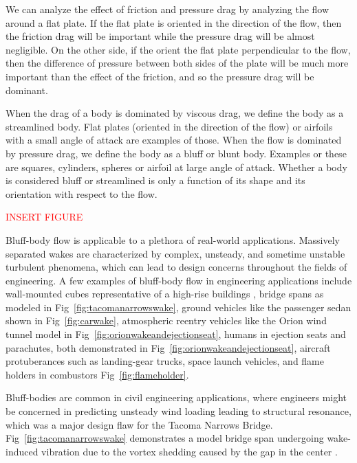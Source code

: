 \documentclass[journal]{new-aiaa}
\begin{document}
We can analyze the effect of friction and pressure drag by analyzing the flow around a flat plate. If the flat plate is oriented in the direction of the flow, then the friction drag will be important while the pressure drag will be almost negligible. On the other side, if the orient the flat plate perpendicular to the flow, then the difference of pressure between both sides of the plate will be much more important than the effect of the friction, and so the pressure drag will be dominant.

When the drag of a body is dominated by viscous drag, we define the body as a streamlined body. Flat plates (oriented in the direction of the flow) or  airfoils with a small angle of attack are examples of those. When the flow is dominated by pressure drag, we define the body as a bluff or blunt body. Examples or these are squares, cylinders, spheres or airfoil at large angle of attack. Whether a body is considered bluff or streamlined is only a function of its shape and its orientation with respect to the flow.

\begin{center}
\textcolor{red}{INSERT FIGURE}
\end{center}





Bluff-body flow is applicable to a plethora of real-world applications.  Massively separated wakes are characterized by complex, unsteady, and sometime unstable turbulent phenomena, which can lead to design concerns throughout the fields of engineering. A few examples of bluff-body flow in engineering applications include wall-mounted cubes representative of a high-rise buildings \cite{elkhoury2016assessment}, bridge spans \cite{yuan2017investigation} as modeled in Fig~\ref{fig:tacomanarrowswake}, ground vehicles \cite{mendonca2002towards} like the passenger sedan shown in Fig~\ref{fig:carwake}, atmospheric reentry vehicles \cite{ross2013comprehensive} like the Orion wind tunnel model in Fig~\ref{fig:orionwakeandejectionseat}, humans in ejection seats and parachutes, both demonstrated in Fig~\ref{fig:orionwakeandejectionseat}, aircraft protuberances such as landing-gear trucks, space launch vehicles, and flame holders \cite{tanaka2013bluff} in combustors Fig~\ref{fig:flameholder}.

Bluff-bodies are common in civil engineering applications, where engineers might be concerned in predicting unsteady wind loading leading to structural resonance, which was a major design flaw for the Tacoma Narrows Bridge.  Fig~\ref{fig:tacomanarrowswake} demonstrates a model bridge span undergoing wake-induced vibration due to the vortex shedding caused by the gap in the center \cite{yuan2017investigation}.
\end{document}
